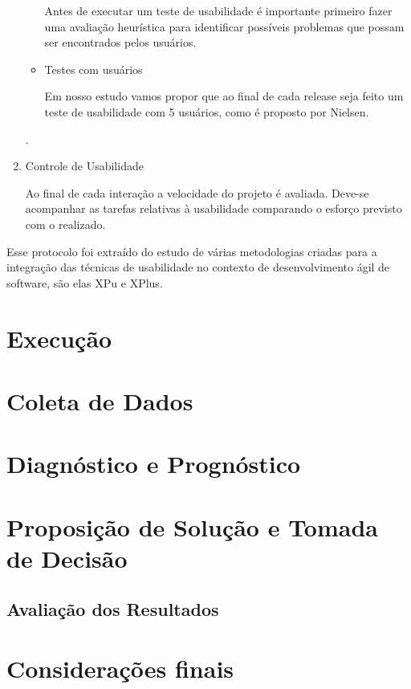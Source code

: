 \begin{enumerate}
\begin{itemize}
		Antes de executar um teste de usabilidade é importante primeiro fazer uma avaliação heurística para identificar possíveis problemas que possam ser encontrados pelos usuários.
		
		\item Testes com usuários
		
		Em nosso estudo vamos propor que ao final de cada release seja feito um teste de usabilidade com 5 usuários, como é proposto por Nielsen.
				
	\end{itemize} 
	.
	
\item Controle de Usabilidade
	
	Ao final de cada interação a velocidade do projeto é avaliada. Deve-se acompanhar as tarefas relativas à usabilidade comparando o esforço previsto com o realizado.
	
\end{enumerate}
Esse protocolo foi extraído do estudo de várias metodologias criadas para a integração das técnicas de usabilidade no contexto de desenvolvimento ágil de software, são elas XPu e XPlus.
 
 
 
\section{Execução}


\section{Coleta de Dados}

\section{Diagnóstico e Prognóstico}

\section{Proposição de Solução e Tomada de Decisão}

\subsection{Avaliação dos Resultados}

\section{Considerações finais}







